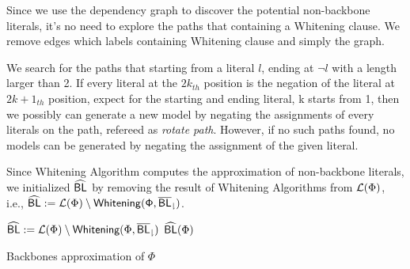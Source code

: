  Since we use the dependency graph to discover the potential non-backbone literals, it's no need to explore the paths that containing a Whitening clause. We remove edges which labels containing Whitening clause and simply the graph.

 We search for the paths that starting from a literal $l$, ending at $\neg l$ with a length larger than 2. If every literal at the $2k_{th}$ position is the negation of the literal at $2k+1_{th}$ position, expect for the starting and ending literal, k starts from 1, then we possibly can generate a new model by negating the assignments of every literals on the path, refereed as \emph{rotate path}. However, if no such paths found, no models can be generated by negating the assignment of the given literal.

  Since Whitening Algorithm computes the approximation of non-backbone literals, we initialized ${\sf \widehat{BL}}$ by removing the result of Whitening Algorithms from ${\cal L}(\Phi)$, i.e., ${\sf \widehat{BL}}:={\cal L}(\Phi)\setminus{\sf Whitening(\Phi,{\sf \overline{BL}_\downharpoonright})}$.
   

\begin{algorithm}
\SetAlgoShortEnd
\SetFillComment
{}


${\sf \widehat{BL}}:={\cal L}(\Phi)\setminus{\textsf{Whitening}}(\Phi,{\sf \overline{BL}_\downharpoonright})$\;
\Return ${\sf \widehat{BL}}(\Phi)$\;
\caption{Backbones approximation of $\Phi$}
\label{alg:nBLo}
\end{algorithm}
 